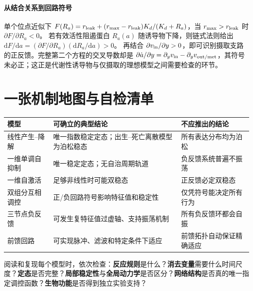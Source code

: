 \documentclass[11pt,a4paper,UTF8,fontset=fandol]{ctexart}
\newcommand{\dd}{\mathrm d}\newcommand{\R}{\mathbb R}\newcommand{\ssv}{\mathrm{ss}}
\begin{document}
\paragraph{从结合关系到回路符号}
单个位点近似下 $F(R_a)=r_{\rm leak}+(r_{\rm max}-r_{\rm leak})K_d/(K_d+R_a)$，当 $r_{\rm max}>r_{\rm leak}$ 时 $\partial F/\partial R_a<0$。
若有效活性阻遏蛋白 $R_a(a)$ 随诱导物下降，则链式法则给出 $\dd F/\dd a=(\partial F/\partial R_a)(\dd R_a/\dd a)>0$。
再结合 $\partial v_{\rm in}/\partial y>0$，即可识别摄取支路的正反馈。完整第二个方程的交叉导数却是
$\partial\dot a/\partial y=\partial_yv_{\rm in}-\partial_yv_{\rm out/met}$，其符号未必正；这正是代谢性诱导物与仅摄取的理想模型之间需要检查的环节。

\section{一张机制地图与自检清单}
\begin{center}\begin{tabular}{p{2.6cm}p{5.2cm}p{3.8cm}}\toprule
模型 & 可确立的典型结论 & 不应推出的结论\\\midrule
线性产生--降解 & 唯一指数稳定定态；出生--死亡离散模型为泊松稳态 & 所有表达分布均为泊松\\
一维单调自抑制 & 唯一稳定定态；无自治周期轨道 & 负反馈系统普遍不振荡\\
一维自激活 & 足够非线性时可能双稳态 & 正反馈必定双稳态\\
双组分互相调控 & 正/负回路符号影响特征值和稳定性 & 仅凭符号能决定所有行为\\
三节点负反馈 & 可发生复特征值过虚轴、支持振荡机制 & 所有负反馈环都会自振\\
前馈回路 & 可实现脉冲、滤波和特定条件下适应 & 前馈拓扑自动保证精确适应\\
\bottomrule\end{tabular}\end{center}

\noindent 阅读和复现每个模型时，依次检查：\textbf{反应规则}是什么？\textbf{消去变量}需要什么时间尺度？\textbf{定态}是否完整？\textbf{局部稳定性}与\textbf{全局动力学}是否区分？\textbf{网络结构}是否真的唯一指定调控函数？\textbf{生物功能}是否得到独立实验支持？
\end{document}
